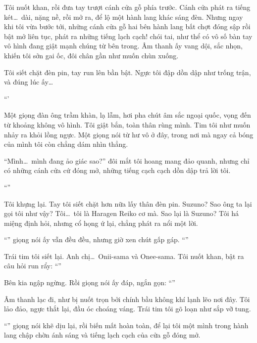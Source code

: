 \documentclass[../main.tex]{subfiles}
\begin{document}
Tôi nuốt khan, rồi đưa tay trượt cánh cửa gỗ phía trước. Cánh cửa phát ra tiếng két\dots\ dài, nặng nề, rồi mở ra, để lộ một hành lang khác sáng đèn. Nhưng ngay khi tôi vừa bước tới, những cánh cửa gỗ hai bên hành lang bất chợt đóng sập rồi bật mở liên tục, phát ra những tiếng lạch cạch! chói tai, như thể có vô số bàn tay vô hình đang giật mạnh chúng từ bên trong. Âm thanh ấy vang dội, sắc nhọn, khiến tôi sởn gai ốc, đôi chân gần như muốn chùn xuống.

Tôi siết chặt đèn pin, tay run lên bần bật. Ngực tôi đập dồn dập như trống trận, và đúng lúc ấy\dots

``'

Một giọng đàn ông trầm khàn, lạ lẫm, hơi pha chút âm sắc ngoại quốc, vọng đến từ khoảng không vô hình. Tôi giật bắn, toàn thân rùng mình. Tim tôi như muốn nhảy ra khỏi lồng ngực. Một giọng nói từ hư vô ở đây, trong nơi mà ngay cả bóng của mình tôi còn chẳng dám nhìn thẳng.

``Mình\dots\ mình đang ảo giác sao?'' đôi mắt tôi hoang mang đảo quanh, nhưng chỉ có những cánh cửa cứ đóng mở, những tiếng cạch cạch dồn dập trả lời tôi.

``''

Tôi khựng lại. Tay tôi siết chặt hơn nữa lấy thân đèn pin. Suzuno? Sao ông ta lại gọi tôi như vậy? Tôi\dots\ tôi là Haragen Reiko cơ mà. Sao lại là Suzuno? Tôi há miệng định hỏi, nhưng cổ họng ứ lại, chẳng phát ra nổi một lời.

``'' giọng nói ấy vẫn đều đều, nhưng giờ xen chút gấp gáp. ``''

Trái tim tôi siết lại. Anh chị\dots\ Onii-sama và Onee-sama. Tôi nuốt khan, bật ra câu hỏi run rẩy: ``''

Bên kia ngập ngừng. Rồi giọng nói ấy đáp, ngắn gọn: ``''

Âm thanh lạc đi, như bị nuốt trọn bởi chính bầu không khí lạnh lẽo nơi đây. Tôi lảo đảo, ngực thắt lại, đầu óc choáng váng. Trái tim tôi gõ loạn như sắp vỡ tung.

``'' giọng nói khẽ dịu lại, rồi biến mất hoàn toàn, để lại tôi một mình trong hành lang chập chờn ánh sáng và tiếng lạch cạch của cửa gỗ đóng mở.
\end{document}
